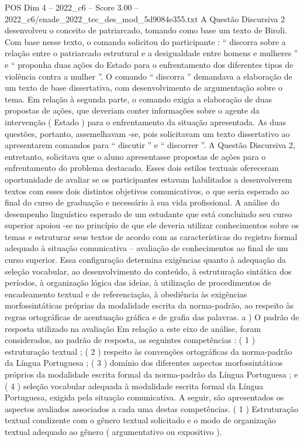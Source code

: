 \begin{textsample}{POS Dim 4 – 2022\_c6 – Score 3.00 – 2022\_c6/enade\_2022\_tec\_des\_mod\_5d9084e355.txt}
A Questão Discursiva 2 desenvolveu o conceito de patriarcado, tomando como base um texto de Biroli.
Com base nesse texto, o comando solicitou do participante : “ discorra sobre a relação entre o patriarcado estrutural e a desigualdade entre homens e mulheres ” e “ proponha duas ações do Estado para o enfrentamento dos diferentes tipos de violência contra a mulher ”.
O comando “ discorra ” demandava a elaboração de um texto de base dissertativa, com desenvolvimento de argumentação sobre o tema.
Em relação à segunda parte, o comando exigia a elaboração de duas propostas de ações, que deveriam conter informações sobre o agente da intervenção ( Estado ) para o enfrentamento da situação apresentada.
As duas questões, portanto, assemelhavam -se, pois solicitavam um texto dissertativo ao apresentarem comandos para “ discutir ” e “ discorrer ”.
A Questão Discursiva 2, entretanto, solicitava que o aluno apresentasse propostas de ações para o enfrentamento do problema destacado.
Esses dois estilos textuais ofereceram oportunidade de avaliar se os participantes estavam habilitados a desenvolverem textos com esses dois distintos objetivos comunicativos, o que seria esperado ao final do curso de graduação e necessário à sua vida profissional.
A análise do desempenho linguístico esperado de um estudante que está concluindo seu curso superior apoiou -se no princípio de que ele deveria utilizar conhecimentos sobre os temas e estruturar seus textos de acordo com as características do registro formal adequado à situação comunicativa – avaliação de conhecimentos ao final de um curso superior.
Essa configuração determina exigências quanto à adequação da seleção vocabular, ao desenvolvimento do conteúdo, à estruturação sintática dos períodos, à organização lógica das ideias, à utilização de procedimentos de encadeamento textual e de referenciação, à obediência às exigências morfossintáticas próprias da modalidade escrita da norma-padrão, ao respeito às regras ortográficas de acentuação gráfica e de grafia das palavras. a ) O padrão de resposta utilizado na avaliação Em relação a este eixo de análise, foram considerados, no padrão de resposta, as seguintes competências : ( 1 ) estruturação textual ; ( 2 ) respeito às convenções ortográficas da norma-padrão da Língua Portuguesa ; ( 3 ) domínio dos diferentes aspectos morfossintáticos próprios da modalidade escrita formal da norma-padrão da Língua Portuguesa ; e ( 4 ) seleção vocabular adequada à modalidade escrita formal da Língua Portuguesa, exigida pela situação comunicativa.
A seguir, são apresentados os aspectos avaliados associados a cada uma destas competências. ( 1 ) Estruturação textual condizente com o gênero textual solicitado e o modo de organização textual adequado ao gênero ( argumentativo ou expositivo ).

\end{textsample}

